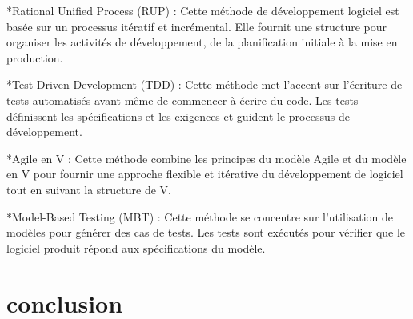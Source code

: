 \documentclass{report}
\begin{document}
*Rational Unified Process (RUP) : Cette méthode de développement logiciel est basée sur un processus itératif et incrémental. Elle fournit une structure pour organiser les activités de développement, de la planification initiale à la mise en production.

*Test Driven Development (TDD) : Cette méthode met l'accent sur l'écriture de tests automatisés avant même de commencer à écrire du code. Les tests définissent les spécifications et les exigences et guident le processus de développement.

*Agile en V : Cette méthode combine les principes du modèle Agile et du modèle en V pour fournir une approche flexible et itérative du développement de logiciel tout en suivant la structure de V.

*Model-Based Testing (MBT) : Cette méthode se concentre sur l'utilisation de modèles pour générer des cas de tests. Les tests sont exécutés pour vérifier que le logiciel produit répond aux spécifications du modèle.


\section{conclusion}
\end{document}
